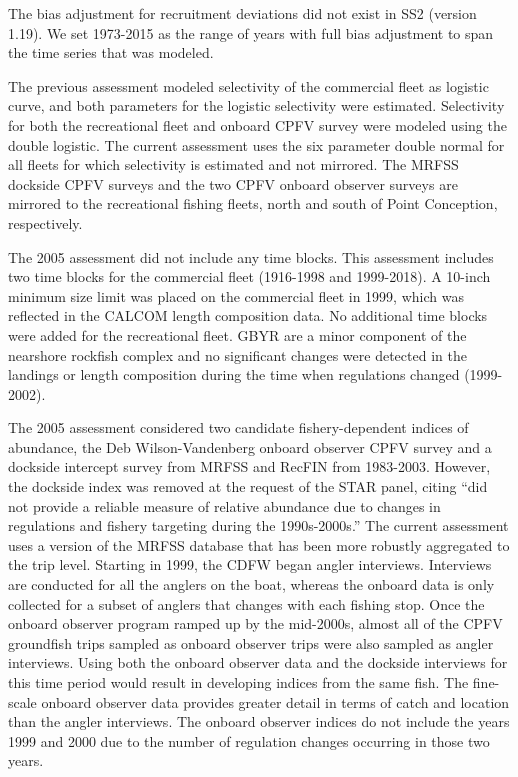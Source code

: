 \documentclass[12pt,]{article}
\begin{document}
The bias adjustment for recruitment deviations did not exist in SS2
(version 1.19). We set 1973-2015 as the range of years with full bias
adjustment to span the time series that was modeled.

The previous assessment modeled selectivity of the commercial fleet as
logistic curve, and both parameters for the logistic selectivity were
estimated. Selectivity for both the recreational fleet and onboard CPFV
survey were modeled using the double logistic. The current assessment
uses the six parameter double normal for all fleets for which
selectivity is estimated and not mirrored. The MRFSS dockside CPFV
surveys and the two CPFV onboard observer surveys are mirrored to the
recreational fishing fleets, north and south of Point Conception,
respectively.

The 2005 assessment did not include any time blocks. This assessment
includes two time blocks for the commercial fleet (1916-1998 and
1999-2018). A 10-inch minimum size limit was placed on the commercial
fleet in 1999, which was reflected in the CALCOM length composition
data. No additional time blocks were added for the recreational fleet.
GBYR are a minor component of the nearshore rockfish complex and no
significant changes were detected in the landings or length composition
during the time when regulations changed (1999-2002).

The 2005 assessment considered two candidate fishery-dependent indices
of abundance, the Deb Wilson-Vandenberg onboard observer CPFV survey and
a dockside intercept survey from MRFSS and RecFIN from 1983-2003.
However, the dockside index was removed at the request of the STAR
panel, citing ``did not provide a reliable measure of relative abundance
due to changes in regulations and fishery targeting during the
1990s-2000s.'' The current assessment uses a version of the MRFSS
database that has been more robustly aggregated to the trip level.
Starting in 1999, the CDFW began angler interviews. Interviews are
conducted for all the anglers on the boat, whereas the onboard data is
only collected for a subset of anglers that changes with each fishing
stop. Once the onboard observer program ramped up by the mid-2000s,
almost all of the CPFV groundfish trips sampled as onboard observer
trips were also sampled as angler interviews. Using both the onboard
observer data and the dockside interviews for this time period would
result in developing indices from the same fish. The fine-scale onboard
observer data provides greater detail in terms of catch and location
than the angler interviews. The onboard observer indices do not include
the years 1999 and 2000 due to the number of regulation changes
occurring in those two years.
\end{document}
